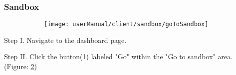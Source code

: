\subsubsection{Sandbox}
\begin{figure}[H]
	\begin{subfigure}{0.60\linewidth}
		\texttt{[image: userManual/client/sandbox/goToSandbox]}
		\caption{}
		\label{fig:goToSanbox}
	\end{subfigure}
\end{figure}

\begin{userManualItemlist}
	\item[Step I.] Navigate to the dashboard page.
	\item[Step II.] Click the button(1) labeled "Go" within the "Go to sandbox" area. (Figure: \ref{fig:goToSanbox})
	
\end{userManualItemlist}